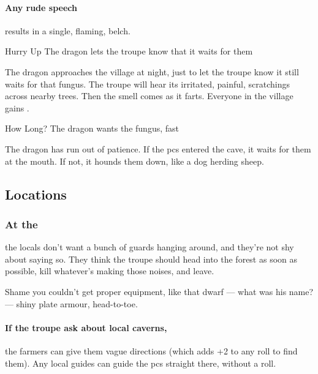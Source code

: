 \documentclass[10pt,twoside]{book}
\begin{document}
\paragraph{Any rude speech}
results in a single, flaming, belch.

\setcounter{diceNo}{1}

\vspace{-2em}
{Hurry Up}%
{The dragon lets the troupe know that it waits for them}%

The dragon approaches the \gls{village} at night, just to let the troupe know it still waits for that fungus.
The troupe will hear its irritated, painful, scratchings across nearby trees.
Then the smell comes as it farts.
Everyone in the \gls{village} gains .

{How Long?}%
{The dragon wants the fungus, fast}%

The dragon has run out of patience.
If the \glspl{pc} entered the cave, it waits for them at the mouth.
If not, it hounds them down, like a dog herding sheep.

\subsection{Locations}

\subsubsection{At the }\label{wyrmBailey}
the locals don't want a bunch of \glspl{guard} hanging around, and they're not shy about saying so.
They think the troupe should head into the forest as soon as possible, kill whatever's making those noises, and leave.

\begin{speechtext}
  Shame you couldn't get proper equipment, like that dwarf --- what was his name? --- shiny plate armour, head-to-toe.
\end{speechtext}

\paragraph{If the troupe ask about local caverns,}
the farmers can give them vague directions (which adds +2 to any roll to find them).
Any local guides can guide the \glspl{pc} straight there, without a roll.
\end{document}
